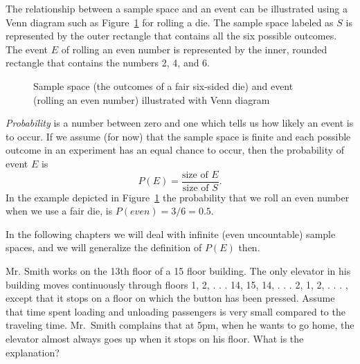 The relationship between a sample space and an event can be illustrated using a
Venn diagram such as Figure~\ref{fig:ch3:probability-event} for rolling a die. The
sample space labeled as $S$ is represented by the outer rectangle that contains
all the
six possible outcomes. The event $E$ of rolling an even number is represented
by the inner, rounded rectangle  that contains the numbers 2, 4, and 6.

\begin{figure}[H]
\caption{Sample space (the outcomes of a fair six-sided die) and event (rolling
an even number) illustrated with Venn diagram} \label{fig:ch3:probability-event}
\end{figure}

\emph{Probability} is a number between zero and one which tells us how likely
an event is to occur. If we assume (for now) that the sample space is finite and
each possible outcome in an experiment  has an equal chance to occur, then the
probability of event $E$ is
\begin{equation}
  P(E) =\frac{\text{size of } E}{\text{size of } S}.
\end{equation}
  In the example depicted in Figure~\ref{fig:ch3:probability-event} the probability
that we roll an even number when we use a fair die, is $P(even)=3/6=0.5$.
  
In the following chapters we will deal with infinite (even uncountable) sample
spaces, and we will generalize the definition of $P(E)$ then.
  
 \begin{example}
  Mr. Smith works on the 13th floor of a 15 floor building. The only elevator
in his building  moves continuously through floors 1, 2, . . . 14, 15, 14, . .
. 2, 1, 2,  . . . , except that it stops on a floor on which the button has
been pressed. Assume that time spent loading and unloading passengers is very
small
  compared to the traveling time.  Mr.~Smith complains that at 5pm, when he
wants to go home, the elevator almost always goes up when it stops on his
  floor. What is the explanation?
\end{example}

